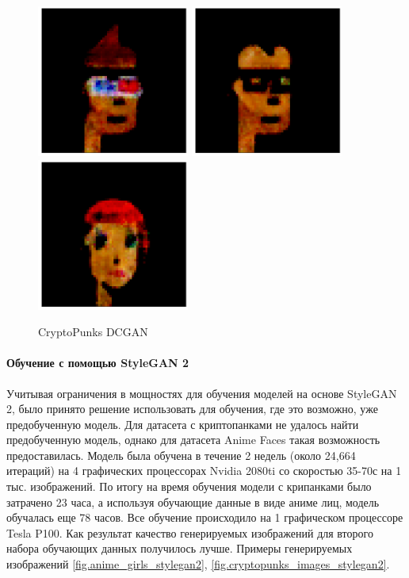 \begin{figure}
    \centering
    \includegraphics[height=50mm, width=.3\textwidth]{fig/cryptopunk_1_example_dcgan.png}\hfill
    \includegraphics[height=50mm, width=.3\textwidth]{fig/cryptopunk_2_example_dcgan.png}\hfill
    \includegraphics[height=50mm, width=.3\textwidth]{fig/cryptopunk_3_example_dcgan.png}
    \caption{CryptoPunks DCGAN}
    \label{fig.cryptopunks_images_dcgan}
\end{figure}

\paragraph{Обучение с помощью StyleGAN 2}

Учитывая ограничения в мощностях для обучения моделей на основе StyleGAN 2, было принято решение использовать для обучения, где это возможно, уже предобученную модель. Для датасета с криптопанками не удалось найти предобученную модель, однако для датасета Anime Faces такая возможность предоставилась. Модель была обучена в течение 2 недель (около 24,664 итераций) на 4 графических процессорах Nvidia 2080ti со скоростью 35-70с на 1 тыс. изображений. По итогу на время обучения модели с крипанками было затрачено 23 часа, а используя обучающие данные в виде аниме лиц, модель обучалась еще 78 часов. Все обучение происходило на 1 графическом процессоре Tesla P100. Как результат качество генерируемых изображений для второго набора обучающих данных получилось лучше.
Примеры генерируемых изображений {\color{blue} \ref{fig.anime_girls_stylegan2}}, {\color{blue} \ref{fig.cryptopunks_images_stylegan2}}.

